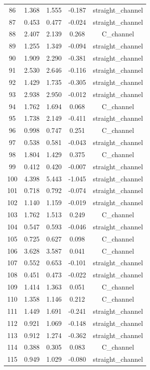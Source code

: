 \begin{longtable}{ccccc}
86 & 1.368 & 1.555 & -0.187 & straight_channel \\
87 & 0.453 & 0.477 & -0.024 & straight_channel \\
88 & 2.407 & 2.139 & 0.268 & C_channel \\
89 & 1.255 & 1.349 & -0.094 & straight_channel \\
90 & 1.909 & 2.290 & -0.381 & straight_channel \\
91 & 2.530 & 2.646 & -0.116 & straight_channel \\
92 & 1.429 & 1.735 & -0.305 & straight_channel \\
93 & 2.938 & 2.950 & -0.012 & straight_channel \\
94 & 1.762 & 1.694 & 0.068 & C_channel \\
95 & 1.738 & 2.149 & -0.411 & straight_channel \\
96 & 0.998 & 0.747 & 0.251 & C_channel \\
97 & 0.538 & 0.581 & -0.043 & straight_channel \\
98 & 1.804 & 1.429 & 0.375 & C_channel \\
99 & 0.412 & 0.420 & -0.007 & straight_channel \\
100 & 4.398 & 5.443 & -1.045 & straight_channel \\
101 & 0.718 & 0.792 & -0.074 & straight_channel \\
102 & 1.140 & 1.159 & -0.019 & straight_channel \\
103 & 1.762 & 1.513 & 0.249 & C_channel \\
104 & 0.547 & 0.593 & -0.046 & straight_channel \\
105 & 0.725 & 0.627 & 0.098 & C_channel \\
106 & 3.628 & 3.587 & 0.041 & C_channel \\
107 & 0.552 & 0.653 & -0.101 & straight_channel \\
108 & 0.451 & 0.473 & -0.022 & straight_channel \\
109 & 1.414 & 1.363 & 0.051 & C_channel \\
110 & 1.358 & 1.146 & 0.212 & C_channel \\
111 & 1.449 & 1.691 & -0.241 & straight_channel \\
112 & 0.921 & 1.069 & -0.148 & straight_channel \\
113 & 0.912 & 1.274 & -0.362 & straight_channel \\
114 & 0.388 & 0.305 & 0.083 & C_channel \\
115 & 0.949 & 1.029 & -0.080 & straight_channel \\

\end{longtable}
